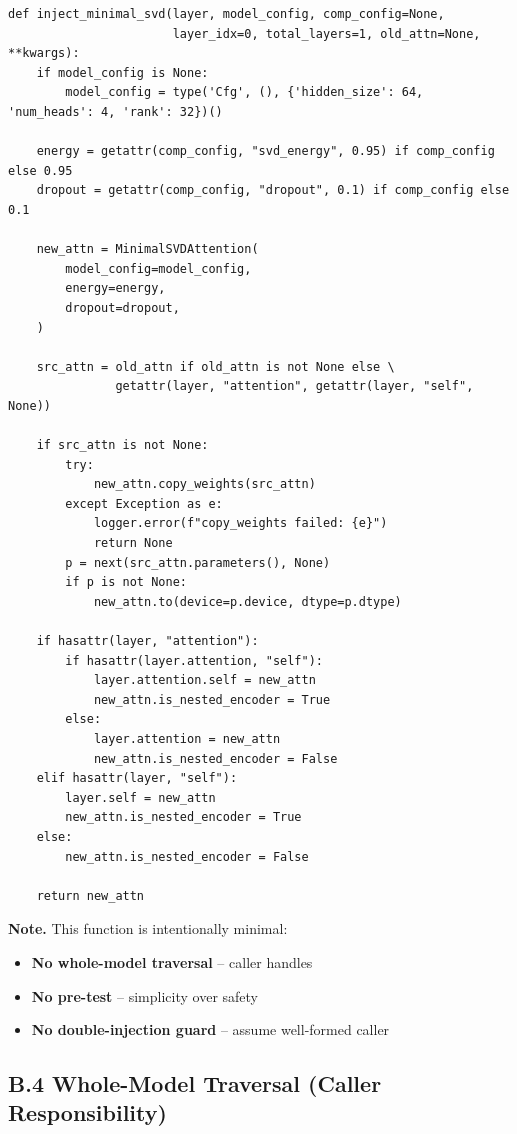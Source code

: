 \begin{lstlisting}
def inject_minimal_svd(layer, model_config, comp_config=None,
                       layer_idx=0, total_layers=1, old_attn=None, **kwargs):
    if model_config is None:
        model_config = type('Cfg', (), {'hidden_size': 64, 'num_heads': 4, 'rank': 32})()
    
    energy = getattr(comp_config, "svd_energy", 0.95) if comp_config else 0.95
    dropout = getattr(comp_config, "dropout", 0.1) if comp_config else 0.1
    
    new_attn = MinimalSVDAttention(
        model_config=model_config,
        energy=energy,
        dropout=dropout,
    )
    
    src_attn = old_attn if old_attn is not None else \
               getattr(layer, "attention", getattr(layer, "self", None))
    
    if src_attn is not None:
        try:
            new_attn.copy_weights(src_attn)
        except Exception as e:
            logger.error(f"copy_weights failed: {e}")
            return None
        p = next(src_attn.parameters(), None)
        if p is not None:
            new_attn.to(device=p.device, dtype=p.dtype)
    
    if hasattr(layer, "attention"):
        if hasattr(layer.attention, "self"):
            layer.attention.self = new_attn
            new_attn.is_nested_encoder = True
        else:
            layer.attention = new_attn
            new_attn.is_nested_encoder = False
    elif hasattr(layer, "self"):
        layer.self = new_attn
        new_attn.is_nested_encoder = True
    else:
        new_attn.is_nested_encoder = False
    
    return new_attn
\end{lstlisting}

\textbf{Note.} This function is intentionally minimal:

\begin{itemize}
\item \textbf{No whole-model traversal} -- caller handles
\item \textbf{No pre-test} -- simplicity over safety
\item \textbf{No double-injection guard} -- assume well-formed caller

\end{itemize}
\subsection{B.4 Whole-Model Traversal (Caller Responsibility)}

